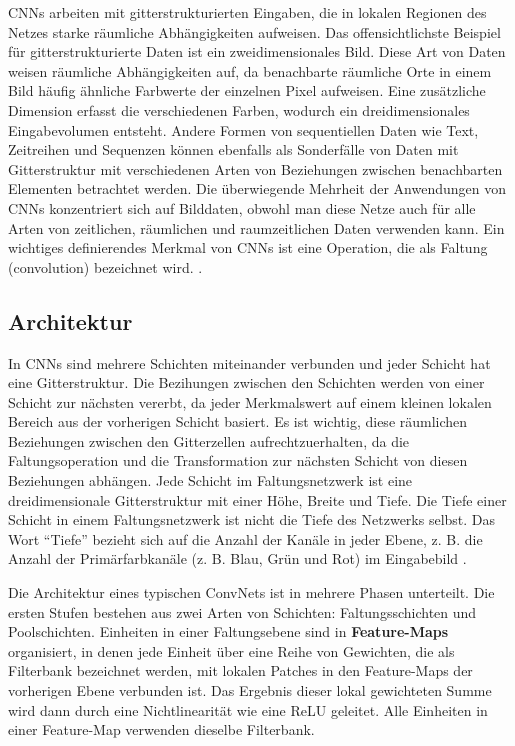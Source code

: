     CNNs arbeiten mit gitterstrukturierten Eingaben, die in lokalen Regionen des Netzes starke räumliche Abhängigkeiten aufweisen. Das offensichtlichste Beispiel für gitterstrukturierte Daten ist ein zweidimensionales Bild. Diese Art von Daten weisen räumliche Abhängigkeiten auf, da benachbarte räumliche Orte in einem Bild häufig ähnliche Farbwerte der einzelnen Pixel aufweisen. Eine zusätzliche Dimension erfasst die verschiedenen Farben, wodurch ein dreidimensionales Eingabevolumen entsteht. Andere Formen von sequentiellen Daten wie Text, Zeitreihen und Sequenzen können ebenfalls als Sonderfälle von Daten mit Gitterstruktur mit verschiedenen Arten von Beziehungen zwischen benachbarten Elementen betrachtet werden. Die überwiegende Mehrheit der Anwendungen von CNNs konzentriert sich auf Bilddaten, obwohl man diese Netze auch für alle Arten von zeitlichen, räumlichen und raumzeitlichen Daten verwenden kann. Ein wichtiges definierendes Merkmal von CNNs ist eine Operation, die als Faltung (convolution) bezeichnet wird. \cite*[315-316]{Aggarwal2018}.




    \subsection{Architektur}
    In CNNs sind mehrere Schichten miteinander verbunden und jeder Schicht hat eine Gitterstruktur. Die Bezihungen zwischen den Schichten werden von einer Schicht zur nächsten vererbt, da jeder Merkmalswert auf einem kleinen lokalen Bereich aus der vorherigen Schicht basiert. Es ist wichtig, diese räumlichen Beziehungen zwischen den Gitterzellen aufrechtzuerhalten, da die Faltungsoperation und die Transformation zur nächsten Schicht von diesen Beziehungen abhängen. Jede Schicht im Faltungsnetzwerk ist eine dreidimensionale Gitterstruktur mit einer Höhe, Breite und Tiefe. Die Tiefe einer Schicht in einem Faltungsnetzwerk ist nicht die Tiefe des Netzwerks selbst. Das Wort \enquote{Tiefe} bezieht sich auf die Anzahl der Kanäle in jeder Ebene, z. B. die Anzahl der Primärfarbkanäle (z. B. Blau, Grün und Rot) im Eingabebild \cite*[318]{Aggarwal2018}.

    Die Architektur eines typischen ConvNets ist in mehrere Phasen unterteilt. Die ersten Stufen bestehen aus zwei Arten von Schichten: Faltungsschichten und Poolschichten. Einheiten in einer Faltungsebene sind in \textbf{Feature-Maps} organisiert, in denen jede Einheit über eine Reihe von Gewichten, die als Filterbank bezeichnet werden, mit lokalen Patches in den Feature-Maps der vorherigen Ebene verbunden ist. Das Ergebnis dieser lokal gewichteten Summe wird dann durch eine Nichtlinearität wie \zb eine ReLU geleitet. Alle Einheiten in einer Feature-Map verwenden dieselbe Filterbank\cite*{Lecun2015}.


